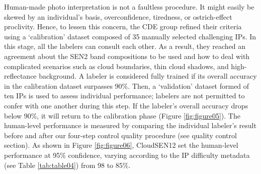 \documentclass[a4paper, nobind]{templates/cdethesis}
\begin{document}
Human-made photo interpretation is not a faultless procedure. It might easily be skewed by an individual's basis, overconfidence, tiredness, or ostrich-effect\cite{Valdez2017} proclivity. Hence, to lessen this concern, the CDE group refined their criteria using a `calibration' dataset composed of 35 manually selected challenging IPs. In this stage, all the labelers can consult each other. As a result, they reached an agreement about the SEN2 band compositions to be used and how to deal with complicated scenarios such as cloud boundaries, thin cloud shadows, and high-reflectance background. A labeler is considered fully trained if its overall accuracy in the calibration dataset surpasses 90\%. Then, a `validation' dataset formed of ten IPs is used to assess individual performance; labelers are not permitted to confer with one another during this step. If the labeler's overall accuracy drops below 90\%, it will return to the calibration phase (Figure \ref{fig:figure05}). The human-level performance is measured by comparing the individual labeler's result before and after our four-step control quality procedure (see quality control section). As shown in Figure \ref{fig:figure06}, CloudSEN12 set the human-level performance at 95\% confidence, varying according to the IP difficulty metadata (see Table \ref{tab:table04}) from 98 to 85\%.
\end{document}
